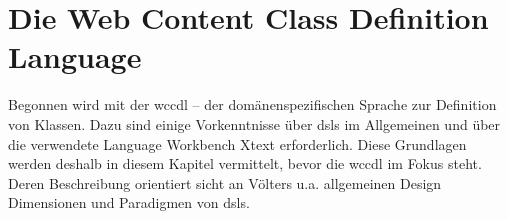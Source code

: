 \section{Die Web Content Class Definition Language}
    \label{section:solutionDetailsDSL}
    Begonnen wird mit der \gls{wccdl} --
    der domänenspezifischen Sprache zur Definition von Klassen.
    Dazu sind einige Vorkenntnisse über \glspl{dsl} im Allgemeinen
    und über die verwendete Language Workbench Xtext erforderlich.
    Diese Grundlagen werden deshalb in diesem Kapitel vermittelt,
    bevor die \gls{wccdl} im Fokus steht.
    Deren Beschreibung orientiert sicht an Völters u.a.
    \cite{voelter:DslEngineering}
    allgemeinen Design Dimensionen und Paradigmen von \glspl{dsl}.

    
    
    
    
    
    
    
    
    
